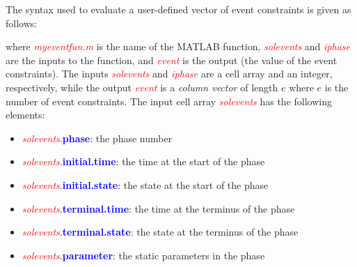 \documentclass[10pt,final]{report}
\newcommand{\bfblue}[1]{\textcolor{blue}{\bf #1}}
\newcommand{\slred}[1]{\textcolor{red}{\sl #1}}
\begin{document}
The syntax used to evaluate a user-defined vector of event constraints
is given as follows:
\begin{center}
\end{center}
{\noindent}where \slred{myeventfun.m} is the name of the MATLAB function,
\slred{solevents} and \slred{iphase} are the inputs to the function, and
\slred{event} is the output (\ie the value of the event constraints).
The inputs \slred{solevents} and \slred{iphase} are a cell array and
an integer, respectively, while the output \slred{event} is a
{\em column vector} of length $e$ where $e$ is the number of event
constraints.  The input cell array \slred{solevents} has the following elements:
\begin{itemize}
  \item \slred{solevents}.\bfblue{phase}:  the phase number
  \item \slred{solevents}.\bfblue{initial.time}:  the time at the start of the phase
  \item \slred{solevents}.\bfblue{initial.state}:  the state at the start of the phase
  \item \slred{solevents}.\bfblue{terminal.time}:  the time at the terminus of the phase
  \item \slred{solevents}.\bfblue{terminal.state}:  the state at the terminus of the phase
  \item \slred{solevents}.\bfblue{parameter}:  the static parameters in the phase
\end{itemize}
\end{document}
